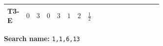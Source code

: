 \documentclass[8pt]{article}
\begin{document}
\begin{landscape}
\begin{longtable}{@{}llcccccc >{\raggedright\arraybackslash}p{0.21\linewidth} >{\raggedright\arraybackslash}p{0.21\linewidth} >{\raggedright\arraybackslash}p{0.21\linewidth}@{}}
\midrule
T3-E & $0$ & $3$ & $0$ & $3$ & $1$ & $2$ & $\frac{1}{2}$ & \scriptsize\adjustbox{max width=\linewidth}{$\begin{gathered} - \frac{\sqrt{3} g_{2}^{2} \overline{y_{1}} \overline{y_{2}}}{6 MF}\end{gathered}$} & \scriptsize\adjustbox{max width=\linewidth}{$\begin{gathered} - \frac{\sqrt{3} i lambda12Inv1 \overline{y_{1}} \overline{y_{2}}}{6 MF}\end{gathered}$} & \scriptsize\adjustbox{max width=\linewidth}{$\begin{gathered} \frac{\sqrt{3} i g_{1}^{2} \overline{y_{1}} \overline{y_{2}}}{8 MF}\end{gathered}$} \\
\midrule
\bottomrule
\end{longtable}
\clearpage
\noindent\textbf{Search name: }\texttt{1,1,6,13}\par\smallskip

\end{landscape}
\end{document}
